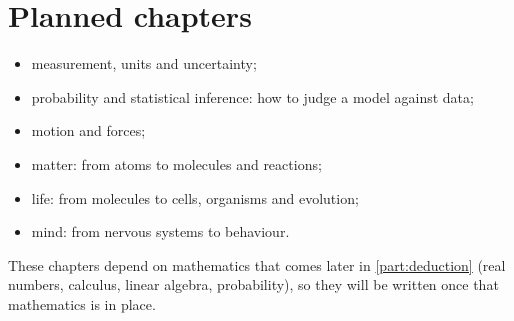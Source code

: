 \section*{Planned chapters}

\begin{itemize}
  \item measurement, units and uncertainty;
  \item probability and statistical inference: how to judge a model against data;
  \item motion and forces;
  \item matter: from atoms to molecules and reactions;
  \item life: from molecules to cells, organisms and evolution;
  \item mind: from nervous systems to behaviour.
\end{itemize}
These chapters depend on mathematics that comes later in \cref{part:deduction}
(real numbers, calculus, linear algebra, probability), so they will be written once
that mathematics is in place.

